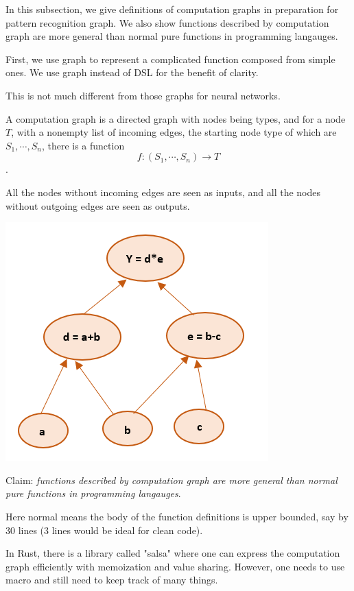 \documentclass[../main.tex]{subfiles}
\begin{document}
In this subsection, we give definitions of computation graphs in preparation for pattern recognition graph. We also show functions described by computation graph are more general than normal pure functions in programming langauges.

First, we use graph to represent a complicated function composed from simple ones. We use graph instead of DSL for the benefit of clarity.

This is not much different from those graphs for neural networks.

\begin{defn}
A computation graph is a directed graph with nodes being types, and for a node $T$, with a nonempty list of incoming edges, the starting node type of which are $S_1,\cdots,S_n$, there is a function $$f: (S_1,\cdots,S_n)\to T$$.
\end{defn}

All the nodes without incoming edges are seen as inputs, and all the nodes without outgoing edges are seen as outputs.

\includegraphics{../computation_graph.png}

Claim: \textit{functions described by computation graph are more general than normal pure functions in programming langauges}.

Here normal means the body of the function definitions is upper bounded, say by 30 lines (3 lines would be ideal for clean code).

\begin{rmk}
In Rust, there is a library called "salsa" where one can express the computation graph efficiently with memoization and value sharing. However, one needs to use macro and still need to keep track of many things.
\end{rmk}
\end{document}
